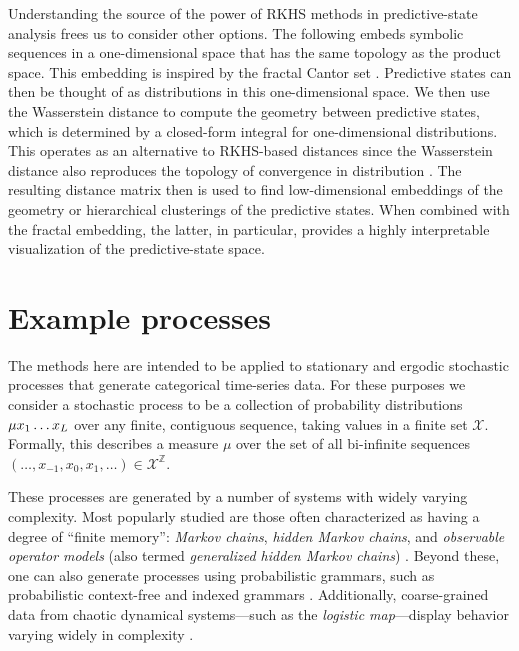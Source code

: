 \documentclass[draft,aps,pre,twocolumn,groupaddress,showkeys,nofootinbib,preprintnumbers,floatfix]{revtex4-2}
\begin{document}
Understanding the source of the power of RKHS methods in predictive-state
analysis frees us to consider other options. The following embeds
symbolic sequences in a one-dimensional space that has the same topology as the
product space. This embedding is inspired by the fractal Cantor set
\cite{Kurk03a}. Predictive states can then be thought of as distributions in
this one-dimensional space. We then use the Wasserstein distance to compute the
geometry between predictive states, which is determined by a closed-form
integral for one-dimensional distributions. This operates as an alternative to
RKHS-based distances since the Wasserstein distance also reproduces the
topology of convergence in distribution \cite{Pane19a}. The resulting distance
matrix then is used to find low-dimensional embeddings \cite{Borg05a} of the
geometry or hierarchical clusterings \cite{Mull11a} of the predictive states.
When combined with the fractal embedding, the latter, in particular, provides a
highly interpretable visualization of the predictive-state space.

\section{Example processes}

The methods here are intended to be applied to stationary and ergodic
stochastic processes that generate categorical time-series data. For these
purposes we consider a stochastic process to be a collection of probability
distributions $\Prob{\mu}{x_1\dots x_L}$ over any finite, contiguous sequence,
taking values in a finite set $\mathcal{X}$. Formally, this describes a measure
$\mu$ over the set of all bi-infinite sequences $(\dots,x_{-1},x_0,x_1,\dots)
\in \mathcal{X}^{\mathbb{Z}}$.

These processes are generated by a number of systems with widely varying
complexity. Most popularly studied are those often characterized as having a
degree of ``finite memory'': \emph{Markov chains}, \emph{hidden Markov chains},
and \emph{observable operator models} (also termed \emph{generalized hidden
Markov chains}) \cite{Uppe97a,Jaeg00a}. Beyond these, one can also generate
processes using probabilistic grammars, such as probabilistic context-free and
indexed grammars \cite{Gema00a}. Additionally, coarse-grained data from chaotic
dynamical systems---such as the \emph{logistic map}---display behavior varying
widely in complexity \cite{Crut92c}.
\end{document}
